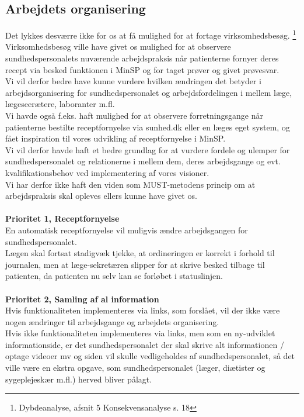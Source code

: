 \subsection{Arbejdets organisering} 
Det lykkes desværre ikke for os at få mulighed for at fortage virksomhedsbesøg. \footnote{Dybdeanalyse, afsnit 5 Konsekvensanalyse s. 18} Virksomhedsbesøg ville have givet os mulighed for at observere sundhedspersonalets nuværende arbejdspraksis når patienterne fornyer deres recept via besked funktionen i MinSP og for taget prøver og givet prøvesvar. \\
Vi vil derfor bedre have kunne vurdere hvilken ændringen det betyder i arbejdsorganisering for sundhedspersonalet og arbejdsfordelingen i mellem læge, lægeseerætere, laboranter m.fl.\\
Vi havde også f.eks. haft mulighed for at observere forretningsgange når patienterne bestilte receptfornyelse via sunhed.dk eller en læges eget system, og fået inspiration til vores udvikling af receptfornyelse i MinSP.\\
Vi vil derfor havde haft et bedre grundlag for at vurdere fordele og ulemper for sundhedspersonalet og relationerne i mellem dem, deres arbejdsgange og evt. kvalifikationsbehov ved implementering af vores visioner.\\
Vi har derfor ikke haft den viden som MUST-metodens princip om at arbejdspraksis skal opleves ellers kunne have givet os. 
\\
\\
\textbf{Prioritet 1, Receptfornyelse} \\
En automatisk receptfornyelse vil muligvis ændre arbejdsgangen for sundhedspersonalet. \\ 
Lægen skal fortsat stadigvæk tjekke, at ordineringen er korrekt i forhold til journalen, men at læge-sekretæren slipper for at skrive besked tilbage til patienten, da patienten nu selv kan se forløbet i statuslinjen.
%
\\\\
\textbf{Prioritet 2, Samling af al information} \\
Hvis funktionaliteten implementeres via links, som forslået, vil der ikke være nogen ændringer til arbejdsgange og arbejdets organisering. \\
Hvis ikke funktionaliteten implementeres via links, men som en ny-udviklet informationside, er det sundhedspersonalet der skal skrive alt informationen / optage videoer mv og siden vil skulle vedligeholdes af sundhedspersonalet, så det ville være en ekstra opgave, som sundhedspersonalet (læger, diætister og sygeplejeskær m.fl.) herved bliver pålagt.
